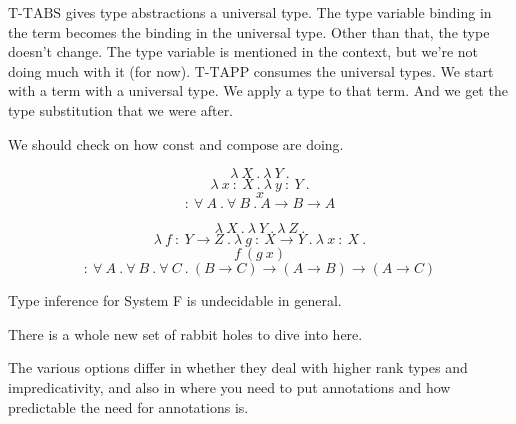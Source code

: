 \begin{frame}
\begin{mdframed}[frametitle={Typing rules (new)}]
\begin{overprint}
  \end{overprint}

  \end{mdframed}

  \medskip

  \begin{overprint}
    $\text{T-TABS}$ gives type abstractions a universal type.
    The type variable binding in the term becomes the binding in the universal type.
    Other than that, the type doesn't change.
    The type variable is mentioned in the context, but we're not doing much with
    it (for now).
    $\text{T-TAPP}$ consumes the universal types.
    We start with a term with a universal type.
    We apply a type to that term.
    And we get the type substitution that we were after.
  \end{overprint}
\end{frame}

\begin{frame}
  We should check on how $\text{const}$ and $\text{compose}$ are doing.
\end{frame}

\begin{frame}
  \[\lambda~X~.~\lambda~Y~.\]
  \[\lambda~x~{:}~X~.~\lambda~y~{:}~Y~.\]
  \[x\]
  \[{:}~\forall~A~.~\forall~B~.~A \rightarrow B \rightarrow A\]
\end{frame}

\begin{frame}
    \[\lambda~X~.~\lambda~Y~.~\lambda~Z~.\]
    \[\lambda~f~{:}~Y \rightarrow Z~.~\lambda~g~{:}~X \rightarrow Y~.~\lambda~x~{:}~X~.\]
    \[f~\left( g~x \right)\]
    \[{:}~\forall~A~.~\forall~B~.~\forall~C~.~\left( B \rightarrow C \right) \rightarrow \left( A \rightarrow B \right) \rightarrow \left( A \rightarrow C \right)\]
\end{frame}

\begin{frame}
  Type inference for System F is undecidable in general.
\end{frame}

\begin{frame}
  There is a whole new set of rabbit holes to dive into here.
\end{frame}

\begin{frame}
  The various options differ in whether they deal with higher rank types and
  impredicativity, and also in where you need to put annotations and how
  predictable the need for annotations is.
\end{frame}

